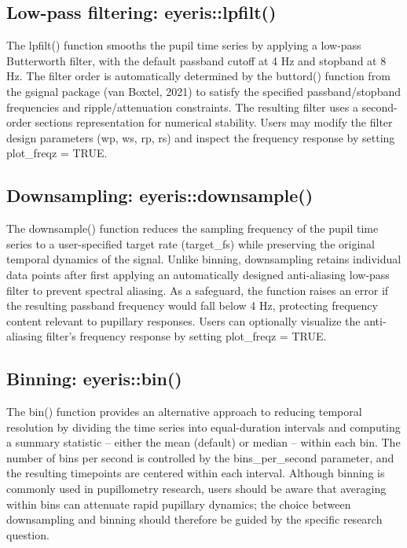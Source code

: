 \subsection{Low-pass filtering: eyeris::lpfilt()}
The lpfilt() function smooths the pupil time series by applying a low-pass Butterworth filter, with the default passband cutoff at 4 Hz and stopband at 8 Hz. The filter order is automatically determined by the buttord() function from the gsignal package (van Boxtel, 2021) to satisfy the specified passband/stopband frequencies and ripple/attenuation constraints. The resulting filter uses a second-order sections representation for numerical stability. Users may modify the filter design parameters (wp, ws, rp, rs) and inspect the frequency response by setting plot\_freqz = TRUE.

\subsection{Downsampling: eyeris::downsample()}
The downsample() function reduces the sampling frequency of the pupil time series to a user-specified target rate (target\_fs) while preserving the original temporal dynamics of the signal. Unlike binning, downsampling retains individual data points after first applying an automatically designed anti-aliasing low-pass filter to prevent spectral aliasing. As a safeguard, the function raises an error if the resulting passband frequency would fall below 4 Hz, protecting frequency content relevant to pupillary responses. Users can optionally visualize the anti-aliasing filter’s frequency response by setting plot\_freqz = TRUE.

\subsection{Binning: eyeris::bin()}
The bin() function provides an alternative approach to reducing temporal resolution by dividing the time series into equal-duration intervals and computing a summary statistic – either the mean (default) or median – within each bin. The number of bins per second is controlled by the bins\_per\_second parameter, and the resulting timepoints are centered within each interval. Although binning is commonly used in pupillometry research, users should be aware that averaging within bins can attenuate rapid pupillary dynamics; the choice between downsampling and binning should therefore be guided by the specific research question.

